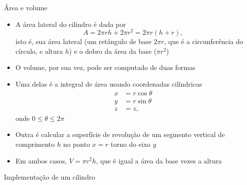 \begin{frame}[fragile]{Área e volume}

    \begin{itemize}
        \item A área lateral do cilindro é dada por 
        \[
            A = 2\pi rh + 2\pi r^2 = 2\pi r(h + r),
        \]
        isto é, sua área lateral (um retângulo de base $2\pi r$, que é a circunferência
            do círculo, e altura $h$) e o dobro da área da base ($\pi r^2$)

        \item O volume, por sua vez, pode ser computado de duas formas

        \item Uma delas é a integral de área usando coordenadas cilíndricas 
        \begin{align*}
            x &= r\cos \theta\\
            y &= r\sin \theta\\
            z &= z,
        \end{align*}
        onde $0 \leq \theta \leq 2\pi$

        \item Outra é calcular a superfície de revolução de um segmento vertical de comprimento
            $h$ no ponto $x = r$ torno do eixo $y$

        \item Em ambos casos, $V = \pi r^2 h$, que é igual a área da base vezes a altura

    \end{itemize}

\end{frame}

\begin{frame}[fragile]{Implementação de um cilindro}
\end{frame}
